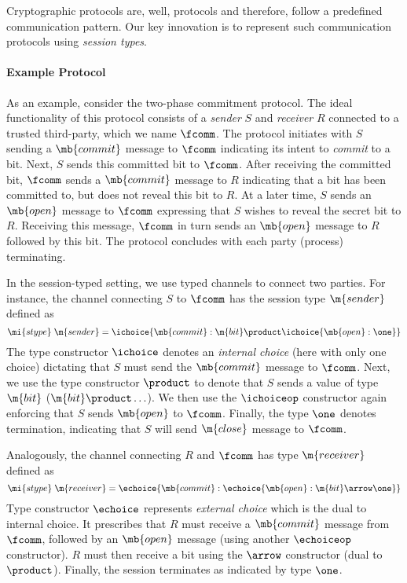 Cryptographic protocols are, well, protocols and therefore, follow
a predefined communication pattern.
Our key innovation is to represent such communication protocols using
\emph{session types}.

\paragraph*{\textbf{Example Protocol}}
As an example, consider the two-phase commitment protocol.
The ideal functionality of this protocol consists of a \emph{sender} $S$
and \emph{receiver} $R$ connected to a trusted third-party, which we
name $\fcomm$.
The protocol initiates with $S$ sending a $\mb{commit}$ message to $\fcomm$
indicating its intent to \emph{commit} to a bit.
Next, $S$ sends this committed bit to $\fcomm$.
After receiving the committed bit, $\fcomm$ sends a $\mb{commit}$ message
to $R$ indicating that a bit has been committed to, but does not reveal
this bit to $R$.
At a later time, $S$ sends an $\mb{open}$ message to $\fcomm$ expressing
that $S$ wishes to reveal the secret bit to $R$.
Receiving this message, $\fcomm$ in turn sends an $\mb{open}$ message
to $R$ followed by this bit.
The protocol concludes with each party (process) terminating.

In the session-typed setting, we use typed channels to connect two
parties. For instance, the channel connecting $S$ to $\fcomm$
has the session type $\m{sender}$ defined as
\[
  \mi{stype} \; \m{sender} = \ichoice{\mb{commit} : \m{bit} \product
  \ichoice{\mb{open} : \one}}
\]
The type constructor $\ichoice$ denotes an \emph{internal choice}
(here with only one choice) dictating that $S$ must send the
$\mb{commit}$ message to $\fcomm$.
Next, we use the type constructor $\product$ to denote that $S$
sends a value of type $\m{bit}$ ($\m{bit} \product \ldots$).
We then use the $\ichoiceop$ constructor again enforcing
that $S$ sends $\mb{open}$ to $\fcomm$.
Finally, the type $\one$ denotes termination, indicating that
$S$ will send $\m{close}$ message to $\fcomm$.

Analogously, the channel connecting $R$ and $\fcomm$ has
type $\m{receiver}$ defined as
\[
  \mi{stype} \; \m{receiver} = \echoice{\mb{commit} : 
  \echoice{\mb{open} : \m{bit} \arrow \one}}
\]
Type constructor $\echoice$ represents \emph{external choice}
which is the dual to internal choice.
It prescribes that $R$ must receive a $\mb{commit}$ message from $\fcomm$,
followed by an $\mb{open}$ message (using another $\echoiceop$ constructor).
$R$ must then receive a bit using the $\arrow$ constructor (dual to
$\product$).
Finally, the session terminates as indicated by type $\one$.

